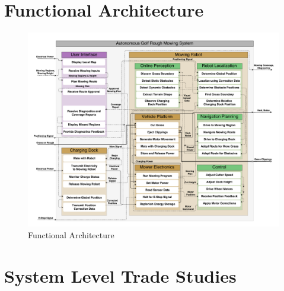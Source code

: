 \documentclass{article}
\begin{document}
\section{Functional Architecture}
\begin{figure}[H]
\includegraphics[scale=0.3]{functional}
\caption{Functional Architecture}
\label{fig:functional}
\end{figure}


\section{System Level Trade Studies}
\end{document}
